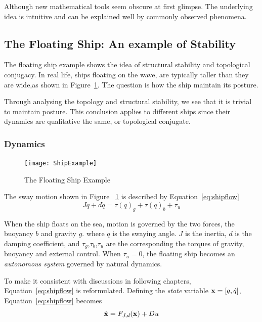 Although new mathematical tools seem obscure at first glimpse.
The underlying idea is intuitive and can be explained well by commonly observed phenomena.



\subsection{The Floating Ship: An example of Stability}
The floating ship  example shows the idea of structural stability and topological conjugacy.
In real life, ships floating on the wave, are typically taller than they are wide,as shown in Figure~\ref{fig:ShipFloating}.
The  question is how the ship maintain its posture.

Through analysing the topology and structural stability, we see that it is trivial to maintain posture.
This conclusion applies to different ships since their dynamics are qualitative the same, or topological conjugate.


\subsubsection*{Dynamics}

\begin{figure}[!htbp]
  \begin{center}
    \texttt{[image: ShipExample]}
    \caption{The Floating Ship Example}
    \label{fig:ShipFloating}
  \end{center}
\end{figure}

The sway motion shown in Figure ~\ref{fig:ShipFloating} is described by Equation~\ref{eq:shipflow}
\begin{equation}
\label{eq:shipflow}
J\ddot{q}+d\dot{q}=\tau(q)_{g}+\tau(q)_{b}+\tau_{u}
\end{equation}

When the ship floats on the sea, motion is governed by the two forces, the buoyancy $b$ and gravity $g$.
where $q$ is the swaying angle.
$J$ is the inertia,  
$d$ is the damping coefficient,
and $\tau_{g}$,$\tau_{b}$,$\tau_{u}$ are the corresponding the torques of gravity, buoyancy and external control.
When $\tau_{u}=0$,  the floating ship  becomes an \emph{autonomous system} governed by natural dynamics.

To make it consistent with discussions in following chapters, Equation~\ref{eq:shipflow} is reformulated.
Defining the \emph{state} variable $\mathbf{x}=[q,\dot{q}]$, Equation~\ref{eq:shipflow} becomes
\[
\dot{\mathbf{x}}=F_{J,d}(\mathbf{x})+Du
\]

